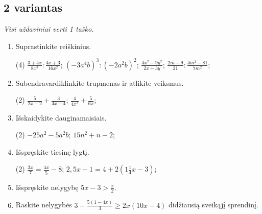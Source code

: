 \documentclass[a4paper]{article}
\begin{document}
\subsection*{2 variantas}

\textit{Visi uždaviniai verti 1 taško.}

\begin{enumerate}
      \item Suprastinkite reiškinius.
            \begin{tasks}[item-format={\normalfont}, after-item-skip=2mm](4)
                  \task $\frac{3+4x}{8x^3}:\frac{4x+3}{16x^2}$;
                  \task $(-3a^4b)^3:(-2a^2b)^2$;
                  \task $\frac{4x^2-9y^2}{2x+3y}$;
                  \task $\frac{2m-9}{21}:\frac{4m^2-81}{7m^2}$;
            \end{tasks}

      \item Subendravardiklinkite trupmenas ir atlikite veiksmus.
            \begin{tasks}[item-format={\normalfont}, after-item-skip=2mm](2)
                  \task $\frac{5}{2x-2}+\frac{3}{4x-4}$;
                  \task $\frac{4}{4x^3}+\frac{5}{6x}$;
            \end{tasks}

      \item Išskaidykite dauginamaisiais.
            \begin{tasks}[item-format={\normalfont}, after-item-skip=2mm](2)
                  \task $-25a^2-5a^2b$;
                  \task $15n^2+n-2$;
            \end{tasks}

      \item Išspręskite tiesinę lygtį.
            \begin{tasks}[item-format={\normalfont}, after-item-skip=2mm](2)
                  \task $\frac{3x}{7}=\frac{4x}{5}-8$;
                  \task $2,5x-1=4+2(1\frac{1}{4}x-3)$;
            \end{tasks}

      \item Išspręskite nelygybę $5x-3>\frac{x}{2}$.
      \item Raskite nelygybės $3-\frac{5(1-4x)}{3}\geq2x(10x-4)$ didžiausią sveikąjį sprendinį.
\end{enumerate}
\end{document}
